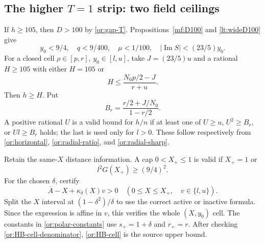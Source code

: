 \documentclass[11pt,reqno]{amsart}
\numberwithin{equation}{section}
\theoremstyle{definition}
\theoremstyle{remark}
\renewcommand{\Im}{\operatorname{Im}}
\begin{document}
\subsection{The higher $T=1$ strip: two field ceilings}

If $h\ge105$, then $D>100$ by \eqref{or:gap-T}.
Propositions~\ref{mf:D100} and \ref{lt:wideD100} give
\begin{equation}\label{or:T-first-phase}
         y_0<9/4,\quad q<9/400,\quad \mu<1/100,\quad
                         |\Im S|<(23/5)y_0.
\end{equation}
For a closed cell $\rho\in[p,r]$, $y_0\in[l,u]$, take
$J=(23/5)u$ and a rational $H\ge105$ with either $H=105$ or
\begin{equation}\label{or:T-field-H}
                  H\le\frac{N_0p/2-J}{r+u}.
\end{equation}
Then $h\ge H$.  Put
\begin{equation}\label{or:T-radial-cell}
             B_r=\frac{r/2+J/N_0}{1-r/2}.
\end{equation}
A positive rational $U$ is a valid bound for $h/n$ if at least one
of $U\ge u$, $U^2\ge B_r$, or $Ul\ge B_r$ holds; the last is
used only for $l>0$.  These follow respectively from
\eqref{or:horizontal}, \eqref{or:radial-ratio}, and
\eqref{or:radial-sharp}.

Retain the same-$X$ distance information.  A cap $0<X_+\le1$ is
valid if $X_+=1$ or
\begin{equation}\label{or:T-Xcap}
                         l^2G(X_+)\ge(9/4)^2.
\end{equation}
For the chosen $\delta$, certify
\begin{equation}\label{or:T-Abar}
 \overline A-X+\kappa_\delta(X)v>0
       \quad(0\le X\le X_+,\quad v\in\{l,u\}).
\end{equation}
Split the $X$ interval at $(1-\delta^2)/\delta$ to use the correct
active or inactive formula.  Since the expression is affine in
$v$, this verifies the whole $(X,y_0)$ cell.  The constants in
\eqref{or:polar-constants} use $s_+=1+\delta$ and $r_+=r$.
After checking \eqref{or:HB-cell-denominator},
\eqref{or:HB-cell} is the source upper bound.
\end{document}
